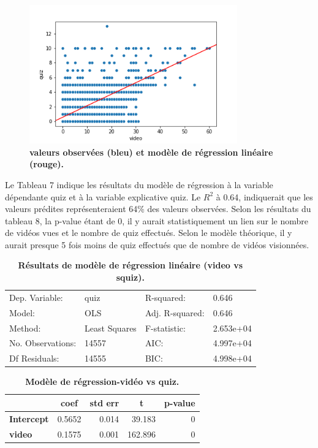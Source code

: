 \documentclass[12pt, a4paper, titlepage, table]{article}
\begin{document}
\begin{figure}[H]
	\centering
	\includegraphics[width=0.8\textwidth]{../../graph/scatter2_regression.png}
	\caption{\textbf{valeurs observées (bleu) et modèle de régression linéaire (rouge).}}
\end{figure}

Le Tableau 7 indique les résultats du modèle de régression à la variable dépendante quiz et à la variable explicative quiz. Le $R^2$ à 0.64, indiquerait que les valeurs prédites représenteraient 64\% des valeurs observées. 
Selon les résultats du tableau 8, la p-value étant de 0, il y aurait statistiquement un lien sur le nombre de vidéos vues et le nombre de quiz effectués. Selon le modèle théorique, il y aurait presque 5 fois moins de quiz effectués que de nombre de vidéos visionnées.

\begin{table}[H]
	\centering
	\fontsize{12}{20}\selectfont
	\begin{tabular}{|ll|ll|}
		\hline
			Dep. Variable:&	quiz&	R-squared:&	0.646\\
			Model:&	OLS&	Adj. R-squared:&	0.646\\
			Method:&	Least Squares&	F-statistic:&	2.653e+04\\
			No. Observations:&	14557&	AIC:&	4.997e+04\\
			Df Residuals:&	14555&	BIC:&	4.998e+04\\
		\hline
	\end{tabular}
\caption{\textbf{Résultats de modèle de régression linéaire (video vs squiz).}}
\end{table}
	
	
\begin{table}[H]
	\centering
	\fontsize{12}{20}\selectfont
	\begin{tabular}{|l|r|r|r|r|}
		\hline
			\multicolumn{1}{|c|}{\textbf{}}&
			\multicolumn{1}{c|}{\textbf{coef}}&
			\multicolumn{1}{c|}{\textbf{std err}}&
			\multicolumn{1}{c|}{\textbf{t}}&
			\multicolumn{1}{c|}{\textbf{p-value}}\\	
		\hline
		\textbf{Intercept}&	0.5652&	0.014&	39.183&	0\\
		\textbf{video}&	0.1575&	0.001&	162.896&	0\\
		\hline
\end{tabular}
\caption{\textbf{Modèle de régression-vidéo vs quiz.}}
\end{table}
\end{document}
